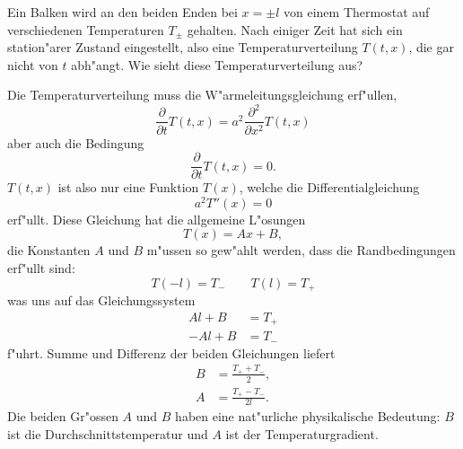 Ein Balken wird an den beiden Enden bei $x=\pm l$ von einem Thermostat
auf verschiedenen Temperaturen $T_\pm$ gehalten. Nach einiger Zeit
hat sich ein station"arer Zustand eingestellt, also eine Temperaturverteilung
$T(t,x)$, die gar nicht von $t$ abh"angt. Wie sieht diese Temperaturverteilung
aus?

\begin{loesung}
Die Temperaturverteilung muss die W"armeleitungsgleichung erf"ullen,
\[
\frac{\partial}{\partial t}T(t,x)=
a^2\frac{\partial^2}{\partial x^2}T(t,x)
\]
aber auch die Bedingung
\[
\frac{\partial}{\partial t}T(t,x)=0.
\]
$T(t,x)$ ist also nur eine Funktion $T(x)$, welche die Differentialgleichung
\[
a^2T''(x)=0
\]
erf"ullt. Diese Gleichung hat die allgemeine L"osungen
\[
T(x)=Ax+B,
\]
die Konstanten $A$ und $B$ m"ussen so gew"ahlt werden, dass
die Randbedingungen erf"ullt sind:
\[
T(-l)=T_-\qquad T(l)=T_+
\]
was uns auf das Gleichungssystem
\begin{align*}
Al+B&=T_+\\
-Al+B&=T_-
\end{align*}
f"uhrt.
Summe und Differenz der beiden Gleichungen liefert
\begin{align*}
B&=\frac{T_++T_-}{2},
\\
A&=\frac{T_+-T_-}{2l}.
\end{align*}
Die beiden Gr"ossen $A$ und $B$ haben eine nat"urliche physikalische
Bedeutung: $B$ ist die Durchschnittstemperatur und $A$ ist der
Temperaturgradient.
\end{loesung}
